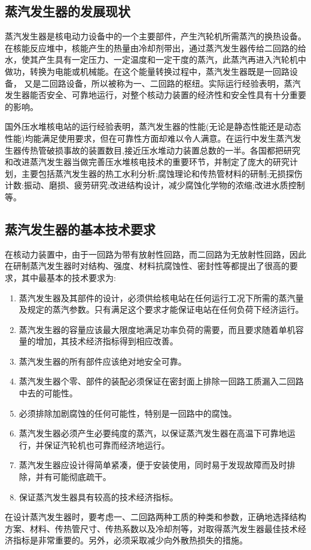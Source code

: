 \subsection{蒸汽发生器的发展现状}
蒸汽发生器是核电动力设备中的一个主要部件，产生汽轮机所需蒸汽的换热设备\cite{1962核动力装置及其设备}。在核能反应堆中，核能产生的热量由冷却剂带出，通过蒸汽发生器传给二回路的给水，使其产生具有一定压力、一定温度和一定干度的蒸汽，此蒸汽再进入汽轮机中做功，转换为电能或机械能\cite{kim2011steam}。在这个能量转换过程中，蒸汽发生器既是一回路设备， 又是二回路设备，所以被称为一、二回路的枢纽。实际运行经验表明，蒸汽发生器能否安全、可靠地运行，对整个核动力装置的经济性和安全性具有十分重要的影响。
\par
国外压水堆核电站的运行经验表明，蒸汽发生器的性能(无论是静态性能还是动态性能)均能满足使用要求，但在可靠性方面却难以令人满意。在运行中发生蒸汽发生器传热管破损事故的装置数目,接近压水堆动力装置总数的一半。各国都把研究和改进蒸汽发生器当做完善压水堆核电技术的重要环节，并制定了庞大的研究计划，主要包括蒸汽发生器的热工水利分析;腐蚀理论和传热管材料的研制;无损探伤计数:振动、磨损、疲劳研究;改进结构设计，减少腐蚀化学物的浓缩;改进水质控制等。

\subsection{蒸汽发生器的基本技术要求}
在核动力装置中，由于一回路为带有放射性回路，而二回路为无放射性回路，因此在研制蒸汽发生器时对结构、强度、材料抗腐蚀性、密封性等都提出了很高的要求，其中最基本的技术要求为:
\begin{enumerate}
    \item 蒸汽发生器及其部件的设计，必须供给核电站在任何运行工况下所需的蒸汽量及规定的蒸汽参数。只有满足这个要求才能保证电站在任何负荷下经济运行。
    \item 蒸汽发生器的容量应该最大限度地满足功率负荷的需要，而且要求随着单机容量的增加，其技术经济指标得到相应改善。
    \item 蒸汽发生器的所有部件应该绝对地安全可靠。
    \item 蒸汽发生器个零、部件的装配必须保证在密封面上排除一回路工质漏入二回路中去的可能性。
    \item 必须排除加剧腐蚀的任何可能性，特别是一回路中的腐蚀。
    \item 蒸汽发生器必须产生必要纯度的蒸汽，以保证蒸汽发生器在高温下可靠地运行，并保证汽轮机也可靠而经济地运行。
    \item 蒸汽发生器应设计得简单紧凑，便于安装使用，同时易于发现故障而及时排除，并有可能彻底疏干。
    \item 保证蒸汽发生器具有较高的技术经济指标。
\end{enumerate}
\par
在设计蒸汽发生器时，要考虑一、二回路两种工质的种类和参数，正确地选择结构方案、材料、传热管尺寸、传热系数以及冷却剂等，对取得蒸汽发生器最佳技术经济指标是非常重要的。另外，必须采取减少向外散热损失的措施。

